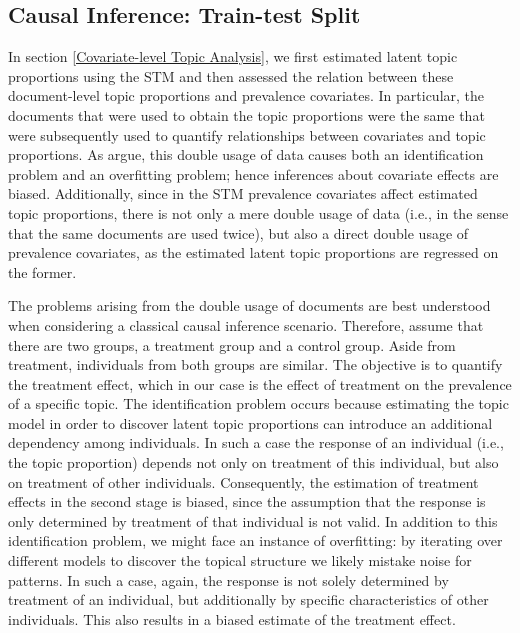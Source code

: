 \subsection{Causal Inference: Train-test Split}
\label{Causal Inference: Train-test Split}

In section \ref{Covariate-level Topic Analysis}, we first estimated latent topic proportions using the STM and then assessed the relation between these document-level topic proportions and prevalence covariates. In particular, the documents that were used to obtain the topic proportions were the same that were subsequently used to quantify relationships between covariates and topic proportions. As \cite{egami2018make} argue, this double usage of data causes both an identification problem and an overfitting problem; hence inferences about covariate effects are biased. Additionally, since in the STM prevalence covariates affect estimated topic proportions, there is not only a mere double usage of data (i.e., in the sense that the same documents are used twice), but also a direct double usage of prevalence covariates, as the estimated latent topic proportions are regressed on the former.

The problems arising from the double usage of documents are best understood when considering a classical causal inference scenario. Therefore, assume that there are two groups, a treatment group and a control group. Aside from treatment, individuals from both groups are similar. The objective is to quantify the treatment effect, which in our case is the effect of treatment on the prevalence of a specific topic. The identification problem occurs because estimating the topic model in order to discover latent topic proportions can introduce an additional dependency among individuals. In such a case the response of an individual (i.e., the topic proportion) depends not only on treatment of this individual, but also on treatment of other individuals. Consequently, the estimation of treatment effects in the second stage is biased, since the assumption that the response is only determined by treatment of that individual is not valid. In addition to this identification problem, we might face an instance of overfitting: by iterating over different models to discover the topical structure we likely mistake noise for patterns. In such a case, again, the response is not solely determined by treatment of an individual, but additionally by specific characteristics of other individuals. This also results in a biased estimate of the treatment effect.

